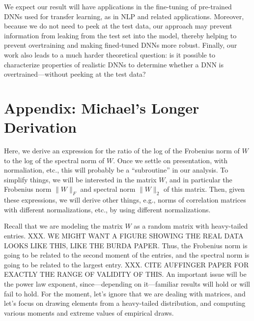 {We expect our result will have applications in the fine-tuning of pre-trained DNNs used for transfer learning, as in NLP and related applications.
Moreover, because we do not need to peek at the test data, our approach may prevent information from leaking from the test set into the model, thereby helping to prevent overtraining and making fined-tuned DNNs more robust.
Finally, our work also leads to a much harder theoretical question: is it possible to characterize properties of realistic DNNs to determine whether a DNN is overtrained---without peeking at the test data?  
 

{ }


{ \iffalse 

\newpage
\section{Appendix: Michael's Longer Derivation}
\label{sxn:appendix-michael_derivation}


Here, we derive an expression for the ratio of the log of the Frobenius norm of $W$ to the log of the spectral norm of $W$.
Once we settle on presentation, with normaliation, etc., this will probably be a ``subroutine'' in our analysis.
To simplify things, we will be interested in the matrix $W$, and in particular the Frobenius norm $\|W\|_F$ and spectral norm $\|W\|_2$ of this matrix.
Then, given these expressions, we will derive other things, e.g., norms of correlation matrices with different normalizations, etc., by using different normalizations.  

Recall that we are modeling the matrix $W$ as a random matrix with heavy-tailed entries.
XXX.  WE MIGHT WANT A FIGURE SHOWING THE REAL DATA LOOKS LIKE THIS, LIKE THE BURDA PAPER.
Thus, the Frobenius norm is going to be related to the second moment of the entries, and the spectral norm is going to be related to the largest entry.
XXX.  CITE AUFFINGER PAPER FOR EXACTLY THE RANGE OF VALIDITY OF THIS.
An important issue will be the power law exponent, since---depending on it---familiar results will hold or will fail to hold.
For the moment, let's ignore that we are dealing with matrices, and let's focus on drawing elements from a heavy-tailed distribution, and computing various moments and extreme values of empirical draws.

}}

